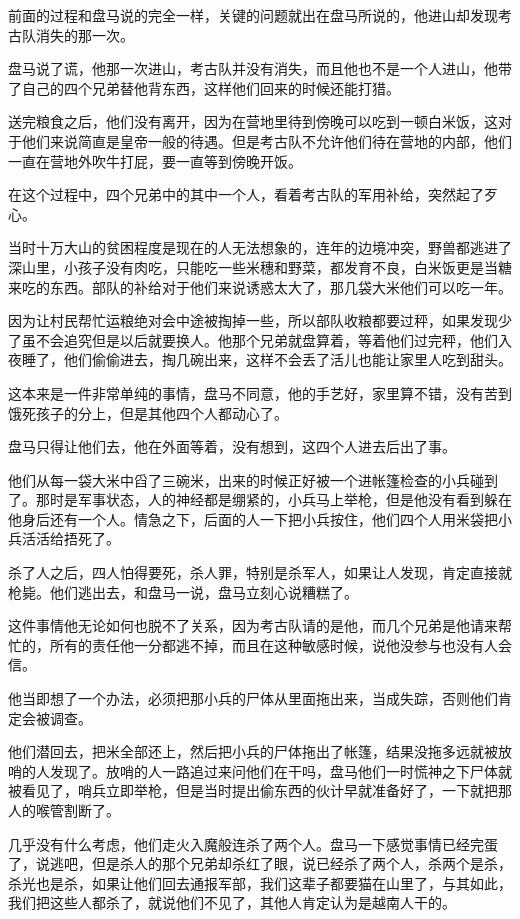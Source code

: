前面的过程和盘马说的完全一样，关键的问题就出在盘马所说的，他进山却发现考古队消失的那一次。

盘马说了谎，他那一次进山，考古队并没有消失，而且他也不是一个人进山，他带了自己的四个兄弟替他背东西，这样他们回来的时候还能打猎。

送完粮食之后，他们没有离开，因为在营地里待到傍晚可以吃到一顿白米饭，这对于他们来说简直是皇帝一般的待遇。但是考古队不允许他们待在营地的内部，他们一直在营地外吹牛打屁，要一直等到傍晚开饭。

在这个过程中，四个兄弟中的其中一个人，看着考古队的军用补给，突然起了歹心。

当时十万大山的贫困程度是现在的人无法想象的，连年的边境冲突，野兽都逃进了深山里，小孩子没有肉吃，只能吃一些米穗和野菜，都发育不良，白米饭更是当糖来吃的东西。部队的补给对于他们来说诱惑太大了，那几袋大米他们可以吃一年。

因为让村民帮忙运粮绝对会中途被掏掉一些，所以部队收粮都要过秤，如果发现少了虽不会追究但是以后就要换人。他那个兄弟就盘算着，等着他们过完秤，他们入夜睡了，他们偷偷进去，掏几碗出来，这样不会丢了活儿也能让家里人吃到甜头。

这本来是一件非常单纯的事情，盘马不同意，他的手艺好，家里算不错，没有苦到饿死孩子的分上，但是其他四个人都动心了。

盘马只得让他们去，他在外面等着，没有想到，这四个人进去后出了事。

他们从每一袋大米中舀了三碗米，出来的时候正好被一个进帐篷检查的小兵碰到了。那时是军事状态，人的神经都是绷紧的，小兵马上举枪，但是他没有看到躲在他身后还有一个人。情急之下，后面的人一下把小兵按住，他们四个人用米袋把小兵活活给捂死了。

杀了人之后，四人怕得要死，杀人罪，特别是杀军人，如果让人发现，肯定直接就枪毙。他们逃出去，和盘马一说，盘马立刻心说糟糕了。

这件事情他无论如何也脱不了关系，因为考古队请的是他，而几个兄弟是他请来帮忙的，所有的责任他一分都逃不掉，而且在这种敏感时候，说他没参与也没有人会信。

他当即想了一个办法，必须把那小兵的尸体从里面拖出来，当成失踪，否则他们肯定会被调查。

他们潜回去，把米全部还上，然后把小兵的尸体拖出了帐篷，结果没拖多远就被放哨的人发现了。放哨的人一路追过来问他们在干吗，盘马他们一时慌神之下尸体就被看见了，哨兵立即举枪，但是当时提出偷东西的伙计早就准备好了，一下就把那人的喉管割断了。

几乎没有什么考虑，他们走火入魔般连杀了两个人。盘马一下感觉事情已经完蛋了，说逃吧，但是杀人的那个兄弟却杀红了眼，说已经杀了两个人，杀两个是杀，杀光也是杀，如果让他们回去通报军部，我们这辈子都要猫在山里了，与其如此，我们把这些人都杀了，就说他们不见了，其他人肯定认为是越南人干的。

